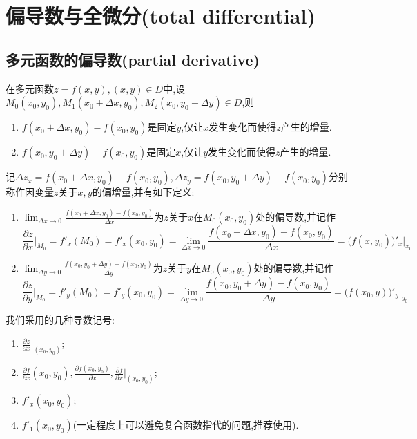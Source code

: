 \setcounter{chapter}{6} %

\chapter{偏导数与全微分(total differential)}

\section{多元函数的偏导数(partial derivative)}

在多元函数$z=f(x,y),(x,y)\in D$中,设$M_0(x_0,y_0),M_1(x_0+\Delta x,y_0),M_2(x_0,y_0+\Delta y)\in D $,则
\begin{enumerate}
    \item $f(x_0+\Delta x,y_0)-f(x_0,y_0)$是固定$y$,仅让$x$发生变化而使得$z$产生的增量.
    \item $f(x_0,y_0+\Delta y)-f(x_0,y_0)$是固定$x$,仅让$y$发生变化而使得$z$产生的增量.
\end{enumerate}

记$\Delta z_x =f(x_0+\Delta x,y_0)-f(x_0,y_0),\Delta z_y =f(x_0,y_0+\Delta y)-f(x_0,y_0)$分别称作因变量$z$关于$x,y$的偏增量,并有如下定义:
\begin{definition}
    \begin{enumerate}
        \item $\lim_{\Delta x \to 0}\frac{f(x_0+\Delta x,y_0)-f(x_0,y_0)}{\Delta x}$为$z$关于$x$在$M_0(x_0,y_0)$处的偏导数,并记作
        $$\frac{\partial z}{\partial x}\bigg|_{M_0}=f'_x(M_0)=f'_x(x_0,y_0)=\lim_{\Delta x \to 0}\frac{f(x_0+\Delta x,y_0)-f(x_0,y_0)}{\Delta x}=\big(f(x,y_0)\big)'_x\bigg|_{x_0}$$

        \item $\lim_{\Delta y \to 0}\frac{f(x_0,y_0+\Delta y)-f(x_0,y_0)}{\Delta y}$为$z$关于$y$在$M_0(x_0,y_0)$处的偏导数,并记作
        $$\frac{\partial z}{\partial y}\bigg|_{M_0}=f'_y(M_0)=f'_y(x_0,y_0)=\lim_{\Delta y \to 0}\frac{f(x_0,y_0+\Delta y)-f(x_0,y_0)}{\Delta y}=\big(f(x_0,y)\big)'_y\bigg|_{y_0}$$
    \end{enumerate}
\end{definition}

\begin{remark}
    我们采用的几种导数记号:
    \begin{enumerate}
        \item $\frac{\partial z}{\partial x}\bigg|_{(x_0,y_0)}$;
        \item $\frac{\partial f}{\partial x}(x_0,y_0),\frac{\partial f(x_0,y_0)}{\partial x},\frac{\partial f}{\partial x}\bigg|_{(x_0,y_0)}$;
        \item $f'_x(x_0,y_0)$;
        \item $f'_1(x_0,y_0)$(一定程度上可以避免复合函数指代的问题,推荐使用).
    \end{enumerate}
\end{remark}

